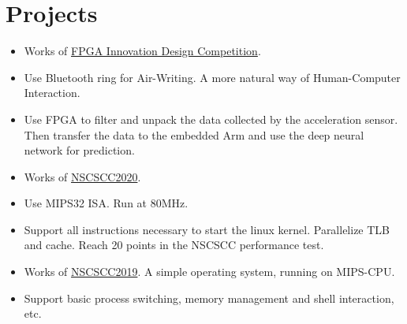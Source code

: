 \documentclass{resume}
\begin{document}
\section{{\bfseries Projects}}
\begin{itemize}[parsep=0.2ex]
    \item Works of \href{http://fpga.icisc.cn/}{FPGA Innovation Design Competition}.
    \item Use Bluetooth ring for Air-Writing. A more natural way of Human-Computer Interaction.
    \item Use FPGA to filter and unpack the data collected by the acceleration sensor. Then transfer the data to the embedded Arm and use the deep neural network for prediction.
\end{itemize}
\begin{itemize}[parsep=0.2ex]
    \item Works of \href{http://www.nscscc.org/}{NSCSCC2020}.
    \item Use MIPS32 ISA. Run at 80MHz.
    \item Support all instructions necessary to start the linux kernel. Parallelize TLB and cache. Reach 20 points in the NSCSCC performance test.
\end{itemize}
\begin{itemize}[parsep=0.2ex]
    \item Works of \href{http://www.nscscc.org/}{NSCSCC2019}. A simple operating system, running on MIPS-CPU.
    \item Support basic process switching, memory management and shell interaction, etc.
\end{itemize}
\end{document}
